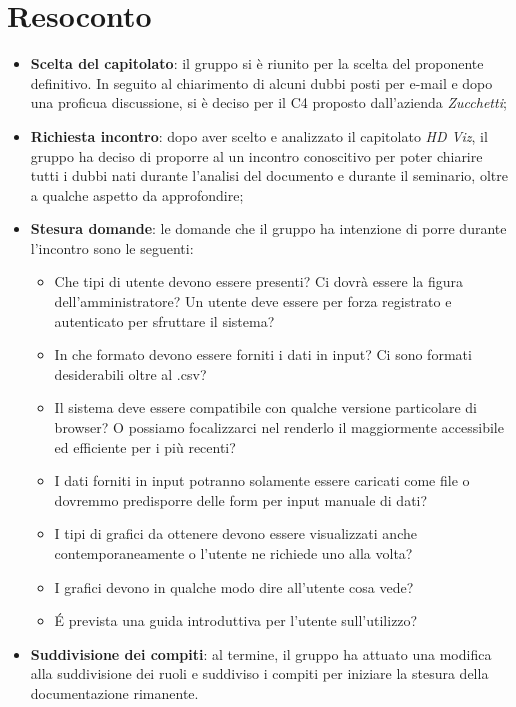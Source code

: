 \section{Resoconto}
\begin{itemize}

\item \textbf{Scelta del capitolato}: il gruppo si è riunito per la scelta del proponente definitivo. In seguito al chiarimento di alcuni dubbi posti per e-mail e dopo una proficua discussione, si è deciso per il  C4 proposto dall'azienda \textit{Zucchetti};

\item \textbf{Richiesta incontro}: dopo aver scelto e analizzato il capitolato \textit{HD Viz}, il gruppo ha deciso di proporre al  un incontro conoscitivo per poter chiarire tutti i dubbi nati durante l'analisi del documento e durante il seminario, oltre a qualche aspetto da approfondire;

\item \textbf{Stesura domande}: le domande che il gruppo ha intenzione di porre durante l'incontro sono le seguenti:
\begin{itemize}
\item Che tipi di utente devono essere presenti? Ci dovrà essere la figura dell'amministratore? Un utente deve essere per forza registrato e autenticato per sfruttare il sistema?
\item In che formato devono essere forniti i dati in input? Ci sono formati desiderabili oltre al .csv?
\item Il sistema deve essere compatibile con qualche versione particolare di browser? O possiamo focalizzarci nel renderlo il maggiormente accessibile ed efficiente per i più recenti?
\item I dati forniti in input potranno solamente essere caricati come file o dovremmo predisporre delle form per input manuale di dati?
\item I tipi di grafici da ottenere devono essere visualizzati anche contemporaneamente o l'utente ne richiede uno alla volta?
\item I grafici devono in qualche modo dire all'utente cosa vede?
\item \'E prevista una guida introduttiva per l'utente sull'utilizzo?
\end{itemize}

\item \textbf{Suddivisione dei compiti}: al termine, il gruppo ha attuato una modifica alla suddivisione dei ruoli e suddiviso i compiti per iniziare la stesura della documentazione rimanente.

\end{itemize}